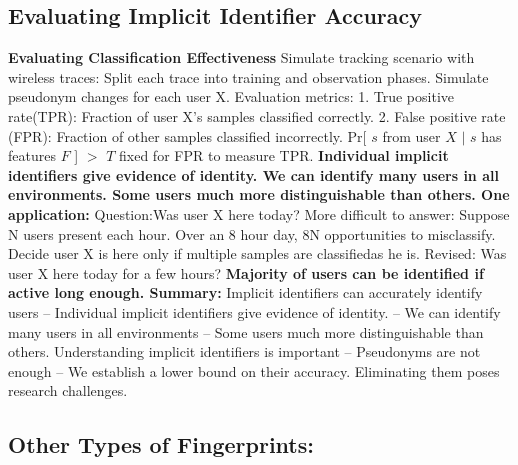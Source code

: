 \documentclass[9pt]{extarticle}
\begin{document}
\begin{multicols}{2}
\subsection{Evaluating Implicit Identifier Accuracy}

\textbf{Evaluating Classification Effectiveness} Simulate tracking scenario with wireless traces: Split each trace into training and observation phases. Simulate pseudonym changes for each user X. Evaluation metrics: 1. True positive rate(TPR): Fraction of user X’s samples classified correctly. 2. False positive rate (FPR): Fraction of other samples classified incorrectly. Pr[ $s$ from user $X$ $|$ $s$ has features $F$ ] $>$ $T$ fixed for FPR to measure TPR. \textbf{Individual implicit identifiers give evidence of identity. We can identify many users in all environments. Some users much more distinguishable than others. One application: }Question:Was user X here today? More difficult to answer: Suppose N users present each hour. Over an 8 hour day, 8N opportunities to misclassify. Decide user X is here only if multiple samples are classifiedas he is. Revised: Was user X here today for a few hours? \textbf{Majority of users can be identified if active long enough. Summary:} Implicit identifiers can accurately identify users – Individual implicit identifiers give evidence of identity. – We can identify many users in all environments – Some users much more distinguishable than others. Understanding implicit identifiers is important – Pseudonyms are not enough – We establish a lower bound on their accuracy. Eliminating them poses research challenges.

\subsection{\textbf{Other Types of Fingerprints:}} 


\end{multicols}
\end{document}
